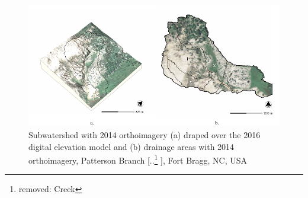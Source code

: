 \documentclass[gmd, manuscript]{copernicus}
\providecommand{\DIFadd}[1]{{\protect\color{blue} \sf #1}} %
\providecommand{\DIFdel}[1]{{\protect\color{red} [..\footnote{removed: #1} ]}} %
\providecommand{\DIFaddFL}[1]{\DIFadd{#1}} %
\providecommand{\DIFdelFL}[1]{\DIFdel{#1}} %
\providecommand{\DIFaddbeginFL}{} %
\providecommand{\DIFaddendFL}{} %
\providecommand{\DIFdelbeginFL}{} %
\providecommand{\DIFdelendFL}{} %
\begin{document}
\begin{figure}
\DIFdelbeginFL %
\DIFdelendFL \DIFaddbeginFL \center
\includegraphics[width=\textwidth,height=0.95\textheight,keepaspectratio]{figures/watershed.pdf}
\DIFaddendFL \caption{Subwatershed with 2014 orthoimagery
\DIFaddbeginFL \DIFaddFL{(a) }\DIFaddendFL draped over \DIFaddbeginFL \DIFaddFL{the }\DIFaddendFL 2016 digital elevation model
\DIFaddbeginFL \DIFaddFL{and (b) drainage areas with 2014 orthoimagery}\DIFaddendFL , Patterson Branch\DIFdelbeginFL \DIFdelFL{Creek}\DIFdelendFL , Fort Bragg, NC, USA}
\DIFdelbeginFL %
\DIFdelendFL \DIFaddbeginFL \label{fig:watershed}
\DIFaddendFL \end{figure}
\end{document}
